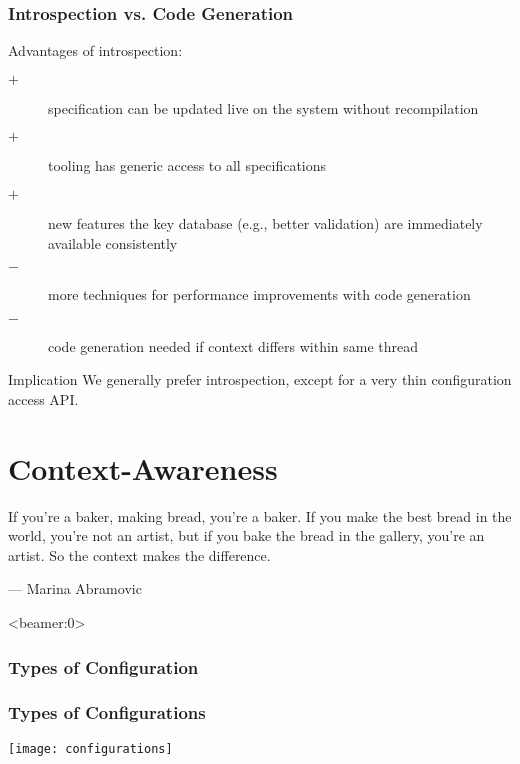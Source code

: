 \begin{frame}
	\frametitle{Introspection vs. Code Generation}
	
	Advantages of introspection:

	\begin{description}
	\item[$+$] specification can be updated live on the system without recompilation
	\item[$+$] tooling has generic access to all specifications
 	\item[$+$] new features the key database (e.g., better validation) are immediately available consistently
	\item[$-$] more techniques for performance improvements with code generation
	\item[$-$] code generation needed if context differs within same thread
	\end{description}

	\vspace{0.5em}

	\begin{alertblock}{Implication}
	We generally prefer introspection, except for a very thin configuration access API.
	\end{alertblock}
\end{frame}




\section{Context-Awareness}

\begin{frame}
	If you're a baker, making bread, you're a baker. If you make the best bread in the world, you're not an artist, but if you bake the bread in the gallery, you're an artist. So the context makes the difference.\par\raggedleft--- \textup{Marina Abramovic}
\end{frame}

\begin{frame}<beamer:0>
	\frametitle{Types of Configuration}
	\begin{description}
	\end{description}
\end{frame}

\begin{frame}
	\frametitle{Types of Configurations}
	\hspace*{-1.2em}\texttt{[image: configurations]}
\end{frame}

